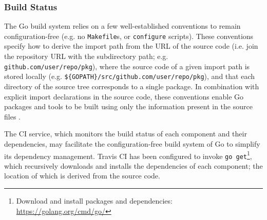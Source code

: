 
\subsubsection{Build Status}

The Go build system relies on a few well-established conventions to remain configuration-free (e.g. no \texttt{Makefile}s, or \texttt{configure} scripts). These conventions specify how to derive the import path from the URL of the source code (i.e. join the repository URL with the subdirectory path; e.g. \texttt{github.com/user/repo/pkg}), where the source code of a given import path is stored locally (e.g. \texttt{\$\{GOPATH\}/src/github.com/user/repo/pkg}), and that each directory of the source tree corresponds to a single package. In combination with explicit import declarations in the source code, these conventions enable Go packages and tools to be built using only the information present in the source files \cite{go_command}.

The CI service, which monitors the build status of each component and their dependencies, may facilitate the configuration-free build system of Go to simplify its dependency management. Travis CI has been configured to invoke \texttt{go get}\footnote{Download and install packages and dependencies: \url{https://golang.org/cmd/go/}}, which recursively downloads and installs the dependencies of each component; the location of which is derived from the source code.

